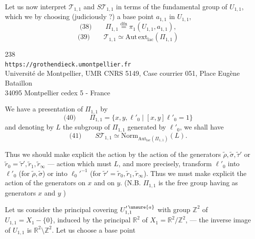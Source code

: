 Let us now interpret $\mathcal T_{1,1}$ and $S\mathcal T_{1,1}$ in terms of the fundamental group of $U_{1,1}$, which we  by choosing (judiciously ?) a base point $a_{1,1}$ in $U_{1,1}$,
\[
\text{(38)}\qquad
\Pi_{1,1}\overset{\mathrm{dfn}}=\pi_1(U_{1,1},a_{1,1}),
\]
\[
\text{(39)}\qquad
\mathcal T_{1,1}\simeq\mathrm{Aut\,ext}_{\mathrm{lac}}(\Pi_{1,1})
\]

\begin{center}
238\\
\texttt{https://grothendieck.umontpellier.fr}\\
Université de Montpellier, UMR CNRS 5149, Case courrier 051, Place Eugène Bataillon\\
34095 Montpellier cedex 5 - France
\end{center}



We have a presentation of $\Pi_{1,1}$ by
\[
\text{(40)}\qquad
\Pi_{1,1}=\{x,y,\ell'_0\mid [x,y]\ell'_0=1\}
\]
and denoting by $L$ the subgroup of $\Pi_{1,1}$ generated by $\ell'_0$, we shall have
\[
\text{(41)}\qquad
S\mathcal T_{1,1}\simeq
\mathrm{Norm}_{\mathrm{Aut}_{\mathrm{lac}}(\Pi_{1,1})}(L).
\]

Thus we should make explicit the action
by the action of the generators $\widetilde\rho,\widetilde\sigma,\widetilde\tau'$ or $\widetilde r_0=\widetilde\tau',\widetilde r_1,\widetilde r_\infty$ --- action which must  $L$, and more precisely, transform $\ell'_0$ into $\ell'_0$ (for $\widetilde\rho,\widetilde\sigma$) or into $\ell_0'^{-1}$ (for $\widetilde\tau'=\widetilde r_0,\widetilde r_1,\widetilde r_\infty$). Thus we must make explicit the action of the generators on $x$ and on $y$. (N.B. $\Pi_{1,1}$ is the free group having as generators $x$ and $y$ \unsure{!})

Let us consider the principal covering $U_{1,1}^{\prime\,\unsure{a}}$ with group $\mathbb Z^2$ of $U_{1,1}=X_1-\{0\}$, induced by the principal  $\mathbb R^2$ of $X_1=\mathbb R^2/\mathbb Z^2$, --- the inverse image of $U_{1,1}$ is $\mathbb R^2\setminus\mathbb Z^2$. Let us choose a base point 

